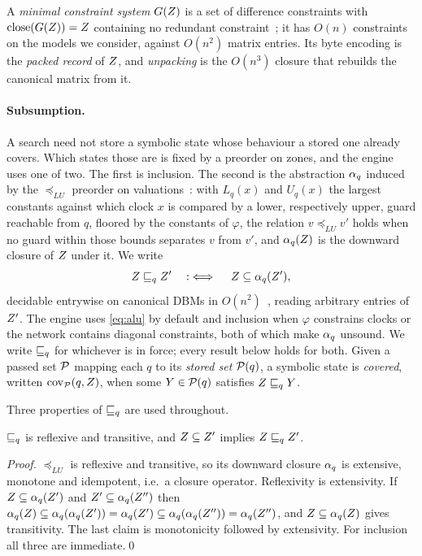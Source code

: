 A \emph{minimal constraint system} $G(Z)$ is a set of difference
constraints with $\mathrm{close}(G(Z)) = Z$ containing no redundant
constraint~\cite{LarsenLPY97}; it has $O(n)$ constraints on the models we
consider, against $O(n^2)$ matrix entries.  Its byte encoding is the
\emph{packed record} of $Z$, and \emph{unpacking} is the $O(n^3)$ closure
that rebuilds the canonical matrix from it.

\paragraph{Subsumption.}
A search need not store a symbolic state whose behaviour a stored one already
covers.  Which states those are is fixed by a preorder on zones, and the engine
uses one of two.  The first is inclusion.  The second is the abstraction
$\alpha_q$ induced by the $\preceq_{LU}$ preorder on
valuations~\cite{Behrmann06,Herbreteau12}: with $L_q(x)$ and $U_q(x)$ the largest
constants against which clock $x$ is compared by a lower, respectively upper,
guard reachable from $q$, floored by the constants of $\varphi$, the relation $v
\preceq_{LU} v'$ holds when no guard within those bounds separates $v$ from $v'$,
and $\alpha_q(Z)$ is the downward closure of $Z$ under it.  We write
\begin{equation}\label{eq:alu}
  Z \sqsubseteq_q Z' \quad:\iff\quad Z \subseteq \alpha_q(Z'),
\end{equation}
decidable entrywise on canonical DBMs in $O(n^2)$~\cite{Herbreteau12}, reading
arbitrary entries of $Z'$.  The engine uses \cref{eq:alu} by default and
inclusion when $\varphi$ constrains clocks or the network contains diagonal
constraints, both of which make $\alpha_q$ unsound.  We write $\sqsubseteq_q$ for
whichever is in force; every result below holds for both.  Given a passed set
$\mathcal{P}$ mapping each $q$ to its \emph{stored set} $\mathcal{P}(q)$, a symbolic
state is \emph{covered}, written $\mathrm{cov}_{\mathcal{P}}(q,Z)$, when some
$Y \in \mathcal{P}(q)$ satisfies $Z \sqsubseteq_q Y$.

Three properties of $\sqsubseteq_q$ are used throughout.

\begin{lemma}[Preorder]\label{lem:preorder}
$\sqsubseteq_q$ is reflexive and transitive, and $Z \subseteq Z'$ implies
$Z \sqsubseteq_q Z'$.
\end{lemma}
\begin{proof}
$\preceq_{LU}$ is reflexive and transitive, so its downward closure $\alpha_q$ is
extensive, monotone and idempotent, i.e.\ a closure operator.  Reflexivity is
extensivity.  If $Z \subseteq \alpha_q(Z')$ and $Z' \subseteq
\alpha_q(Z'')$ then $\alpha_q(Z) \subseteq \alpha_q(\alpha_q(Z')) =
\alpha_q(Z') \subseteq \alpha_q(\alpha_q(Z'')) = \alpha_q(Z'')$, and $Z
\subseteq \alpha_q(Z)$ gives transitivity.  The last claim is monotonicity
followed by extensivity.  For inclusion all three are immediate.\qed
\end{proof}

